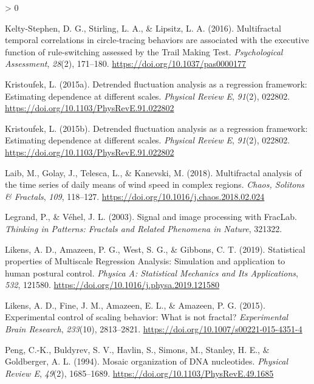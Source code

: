 \documentclass[
  english,
  man]{apa6}
\newlength{\cslhangindent}
\newenvironment{CSLReferences}[2] %
 {%
  \setlength{\parindent}{0pt}
  \ifodd #1 \everypar{\setlength{\hangindent}{\cslhangindent}}\ignorespaces\fi
  \ifnum #2 > 0
  \setlength{\parskip}{#2\baselineskip}
  \fi
 }%
 {}
\begin{document}
\begin{CSLReferences}{1}{0}
\leavevmode\hypertarget{ref-kelty-stephenMultifractalTemporalCorrelations2016}{}%
Kelty-Stephen, D. G., Stirling, L. A., \& Lipsitz, L. A. (2016). Multifractal temporal correlations in circle-tracing behaviors are associated with the executive function of rule-switching assessed by the {Trail} {Making} {Test}. \emph{Psychological Assessment}, \emph{28}(2), 171--180. \url{https://doi.org/10.1037/pas0000177}

\leavevmode\hypertarget{ref-kristoufekDetrendedFluctuationAnalysis2015}{}%
Kristoufek, L. (2015a). Detrended fluctuation analysis as a regression framework: {Estimating} dependence at different scales. \emph{Physical Review E}, \emph{91}(2), 022802. \url{https://doi.org/10.1103/PhysRevE.91.022802}

\leavevmode\hypertarget{ref-kristoufek2015}{}%
Kristoufek, L. (2015b). Detrended fluctuation analysis as a regression framework: Estimating dependence at different scales. \emph{Physical Review E}, \emph{91}(2), 022802. \url{https://doi.org/10.1103/PhysRevE.91.022802}

\leavevmode\hypertarget{ref-laibMultifractalAnalysisTime2018}{}%
Laib, M., Golay, J., Telesca, L., \& Kanevski, M. (2018). Multifractal analysis of the time series of daily means of wind speed in complex regions. \emph{Chaos, Solitons \& Fractals}, \emph{109}, 118--127. \url{https://doi.org/10.1016/j.chaos.2018.02.024}

\leavevmode\hypertarget{ref-legrand2003}{}%
Legrand, P., \& Véhel, J. L. (2003). Signal and image processing with FracLab. \emph{Thinking in Patterns: Fractals and Related Phenomena in Nature}, 321322.

\leavevmode\hypertarget{ref-likensStatisticalPropertiesMultiscale2019}{}%
Likens, A. D., Amazeen, P. G., West, S. G., \& Gibbons, C. T. (2019). Statistical properties of {Multiscale} {Regression} {Analysis}: {Simulation} and application to human postural control. \emph{Physica A: Statistical Mechanics and Its Applications}, \emph{532}, 121580. \url{https://doi.org/10.1016/j.physa.2019.121580}

\leavevmode\hypertarget{ref-likensExperimentalControlScaling2015}{}%
Likens, A. D., Fine, J. M., Amazeen, E. L., \& Amazeen, P. G. (2015). Experimental control of scaling behavior: What is not fractal? \emph{Experimental Brain Research}, \emph{233}(10), 2813--2821. \url{https://doi.org/10.1007/s00221-015-4351-4}

\leavevmode\hypertarget{ref-pengMosaicOrganizationDNA1994}{}%
Peng, C.-K., Buldyrev, S. V., Havlin, S., Simons, M., Stanley, H. E., \& Goldberger, A. L. (1994). Mosaic organization of {DNA} nucleotides. \emph{Physical Review E}, \emph{49}(2), 1685--1689. \url{https://doi.org/10.1103/PhysRevE.49.1685}


\end{CSLReferences}
\end{document}
